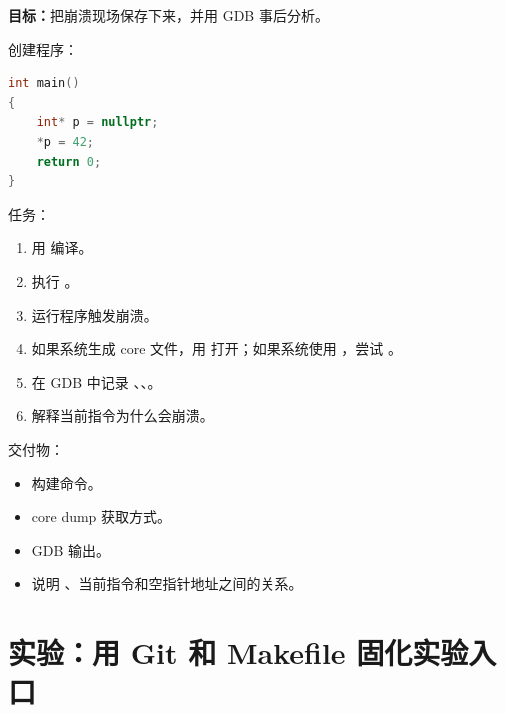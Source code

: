 \begin{labbox}
\textbf{目标：}把崩溃现场保存下来，并用 GDB 事后分析。

创建程序：

\begin{lstlisting}[language=C++]
int main()
{
    int* p = nullptr;
    *p = 42;
    return 0;
}
\end{lstlisting}

任务：

\begin{enumerate}
  \item 用  编译。
  \item 执行 。
  \item 运行程序触发崩溃。
  \item 如果系统生成 core 文件，用  打开；如果系统使用 ，尝试 。
  \item 在 GDB 中记录 、、。
  \item 解释当前指令为什么会崩溃。
\end{enumerate}

交付物：

\begin{itemize}
  \item 构建命令。
  \item core dump 获取方式。
  \item GDB 输出。
  \item 说明 、当前指令和空指针地址之间的关系。
\end{itemize}
\end{labbox}

\section{实验：用 Git 和 Makefile 固化实验入口}

